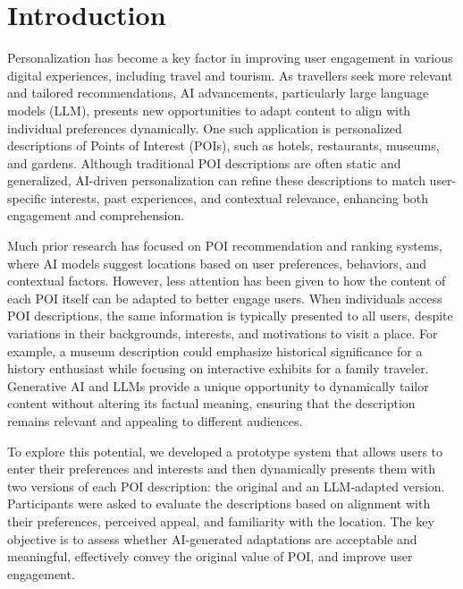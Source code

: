 \documentclass[sigconf,review,anonymous]{acmart}
\begin{document}

\maketitle

\section{Introduction}
Personalization has become a key factor in improving user engagement in various digital experiences, including travel and tourism. As travellers seek more relevant and tailored recommendations, AI advancements, particularly large language models (LLM), presents new opportunities to adapt content to align with individual preferences dynamically. One such application is personalized descriptions of Points of Interest (POIs), such as hotels, restaurants, museums, and gardens. Although traditional POI descriptions are often static and generalized, AI-driven personalization can refine these descriptions to match user-specific interests, past experiences, and contextual relevance, enhancing both engagement and comprehension.

Much prior research has focused on POI recommendation and ranking systems, where AI models suggest locations based on user preferences, behaviors, and contextual factors. However, less attention has been given to how the content of each POI itself can be adapted to better engage users. When individuals access POI descriptions, the same information is typically presented to all users, despite variations in their backgrounds, interests, and motivations to visit a place. For example, a museum description could emphasize historical significance for a history enthusiast while focusing on interactive exhibits for a family traveler. Generative AI and LLMs provide a unique opportunity to dynamically tailor content without altering its factual meaning, ensuring that the description remains relevant and appealing to different audiences.

To explore this potential, we developed a prototype system that allows users to enter their preferences and interests and then dynamically presents them with two versions of each POI description: the original and an LLM-adapted version. Participants were asked to evaluate the descriptions based on alignment with their preferences, perceived appeal, and familiarity with the location. The key objective is to assess whether AI-generated adaptations are acceptable and meaningful, effectively convey the original value of POI, and improve user engagement.
\end{document}
